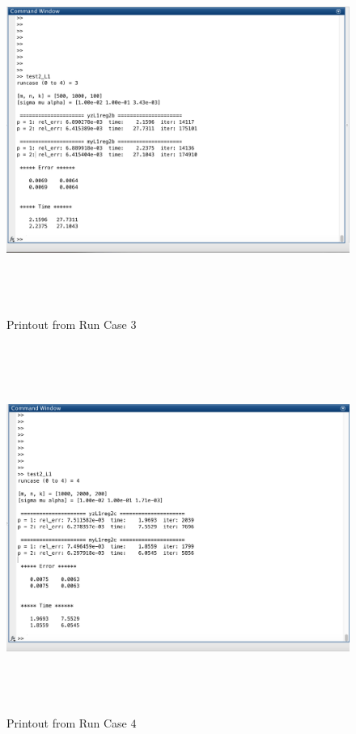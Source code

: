 \begin{figure}[H]
\centering
\includegraphics[height=12cm]{p_3}
\caption{Printout from Run Case $3$}
\end{figure}
\begin{figure}[H]
\centering
\includegraphics[height=12cm]{p_4.png}
\caption{Printout from Run Case $4$}
\end{figure}

